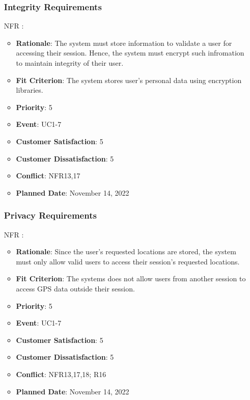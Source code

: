 \documentclass[12pt, titlepage]{article}
\newcounter{reqnum} %
\newcounter{freqnum} %
\begin{document}
\begin{itemize}
\subsubsection{Integrity Requirements}
\item[NFR\refstepcounter{freqnum}\thefreqnum
\label{NFR}:] 
\begin{itemize}
    \item \textbf{Rationale}: The system must store information to validate a user for accessing their session. Hence, the system must encrypt such infromation to maintain integrity of their user.
    \item \textbf{Fit Criterion}: The system stores user's personal data using encryption libraries.
    \item \textbf{Priority}: 5
    \item \textbf{Event}: UC1-7%
    \item \textbf{Customer Satisfaction}: 5
    \item \textbf{Customer Dissatisfaction}: 5
    \item \textbf{Conflict}: NFR13,17
    \item \textbf{Planned Date}: November 14, 2022
\end{itemize}
\subsubsection{Privacy Requirements}
\item[NFR\refstepcounter{freqnum}\thefreqnum
\label{NFR}:] 
\begin{itemize}
    \item \textbf{Rationale}: Since the user's requested locations are stored, the system must only allow valid users to access their session's requested locations.
    \item \textbf{Fit Criterion}: The systems does not allow users from another session to access GPS data outside their session.
    \item \textbf{Priority}: 5
    \item \textbf{Event}: UC1-7%
    \item \textbf{Customer Satisfaction}: 5
    \item \textbf{Customer Dissatisfaction}: 5
    \item \textbf{Conflict}: NFR13,17,18; R16
    \item \textbf{Planned Date}: November 14, 2022
\end{itemize}


\end{itemize}
\end{document}
